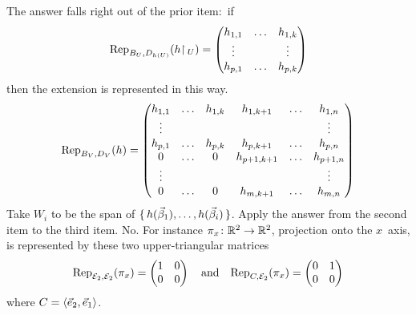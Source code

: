 \begin{exercises}
\begin{answer}
\begin{exparts}
          The answer falls right out of the prior item:~if
          \begin{equation*}
            \rep{\restrictionmap{h}{U}}{B_U,D_{h(U)}}
             =\begin{pmatrix}
                h_{1,1}  &\ldots  &h_{1,k}  \\
                \vdots   &        &\vdots   \\
                h_{p,1}  &\ldots  &h_{p,k}
              \end{pmatrix}
          \end{equation*}
          then the extension is represented in this way.
          \begin{equation*}
            \rep{h}{B_V,D_V}
             =\begin{pmatrix}
                h_{1,1}  &\ldots  &h_{1,k}  &h_{1,k+1}  &\ldots  &h_{1,n}  \\
                \vdots   &        &         &           &        &\vdots   \\
                h_{p,1}  &\ldots  &h_{p,k}  &h_{p,k+1}  &\ldots  &h_{p,n}  \\
                0        &\ldots  &0        &h_{p+1,k+1}&\ldots  &h_{p+1,n}  \\
                \vdots   &        &         &           &        &\vdots   \\
                0        &\ldots  &0        &h_{m,k+1}  &\ldots  &h_{m,n}
              \end{pmatrix}
          \end{equation*}
        \partsitem Take \( W_i \) to be the span of
          \( \set{h(\vec{\beta}_1),\dots,h(\vec{\beta}_i)} \).
        \partsitem Apply the answer from the second item to the third item.
        \partsitem No.
          For instance \( \map{\pi_x}{\Re^2}{\Re^2} \), projection onto
          the \( x \)~axis, is represented by these two upper-triangular
          matrices 
          \begin{equation*}
             \rep{\pi_x}{\stdbasis_2,\stdbasis_2}=
             \begin{pmatrix}
               1  &0  \\
               0  &0
             \end{pmatrix}
             \quad\text{and}\quad
             \rep{\pi_x}{C,\stdbasis_2}=
             \begin{pmatrix}
               0  &1  \\
               0  &0
             \end{pmatrix}
          \end{equation*}
          where \( C=\sequence{\vec{e}_2,\vec{e}_1} \).
      \end{exparts}  
    \end{answer}
\end{exercises}















